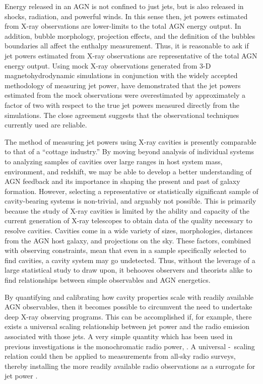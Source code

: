 \documentclass{emulateapj}
\begin{document}
Energy released in an AGN is not confined to just jets, but is also
released in shocks, radiation, and powerful winds. In this sense then,
jet powers estimated from X-ray observations are lower-limits to the
total AGN energy output. In addition, bubble morphology, projection
effects, and the definition of the bubbles boundaries all affect the
enthalpy measurement. Thus, it is reasonable to ask if jet powers
estimated from X-ray observations are representative of the total AGN
energy output. Using mock X-ray observations generated from 3-D
magnetohydrodynamic simulations in conjunction with the widely
accepted methodology of measuring jet power,
\citet{2009arXiv0909.0722M} have demonstrated that the jet powers
estimated from the mock observations were overestimated by
approximately a factor of two with respect to the true jet powers
measured directly from the simulations. The close agreement suggests
that the observational techniques currently used are reliable.

The method of measuring jet powers using X-ray cavities is presently
comparable to that of a ``cottage industry.'' By moving beyond
analysis of individual systems to analyzing samples of cavities over
large ranges in host system mass, environment, and redshift, we may be
able to develop a better understanding of AGN feedback and its
importance in shaping the present and past of galaxy
formation. However, selecting a representative or statistically
significant sample of cavity-bearing systems is non-trivial, and
arguably not possible. This is primarily because the study of X-ray
cavities is limited by the ability and capacity of the current
generation of X-ray telescopes to obtain data of the quality necessary
to resolve cavities. Cavities come in a wide variety of sizes,
morphologies, distances from the AGN host galaxy, and projections on
the sky. These factors, combined with observing constraints, mean that
even in a sample specifically selected to find cavities, a cavity
system may go undetected. Thus, without the leverage of a large
statistical study to draw upon, it behooves observers and theorists
alike to find relationships between simple observables and AGN
energetics.

By quantifying and calibrating how cavity properties scale with
readily available AGN observables, then it becomes possible to
circumvent the need to undertake deep X-ray observing programs. This
can be accomplished if, for example, there exists a universal scaling
relationship between jet power and the radio emission associated with
those jets. A very simple quantity which has been used in previous
investigations is the monochromatic radio power, \prad. A universal
\pjet-\prad\ scaling relation could then be applied to measurements
from all-sky radio surveys, thereby installing the more readily
available radio observations as a surrogate for jet power
\citep{croton06, 2006MNRAS.366..397S}.
\end{document}
